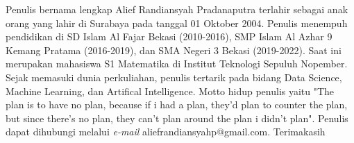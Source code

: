 \documentclass{file/TA-ITS}
\theoremstyle{definition}
\theoremstyle{definition}
\theoremstyle{plain}
\begin{document}
\noindent Penulis bernama lengkap Alief Randiansyah Pradanaputra terlahir sebagai anak orang yang lahir di Surabaya pada tanggal 01 Oktober 2004. Penulis menempuh pendidikan di SD Islam Al Fajar Bekasi (2010-2016), SMP Islam Al Azhar 9 Kemang Pratama (2016-2019), dan SMA Negeri 3 Bekasi (2019-2022). Saat ini merupakan mahasiswa S1 Matematika di Institut Teknologi Sepuluh Nopember. Sejak memasuki dunia perkuliahan, penulis tertarik pada bidang Data Science, Machine Learning, dan Artifical Intelligence. Motto hidup penulis yaitu "The plan is to have no plan, because if i had a plan, they'd plan to counter the plan, but since there's no plan, they can't plan around the plan i didn't plan". Penulis dapat dihubungi melalui \textit{e-mail} aliefrandiansyahp@gmail.com. Terimakasih
\end{document}
